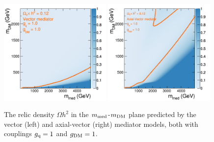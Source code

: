\appendix

\begin{center}
\begin{figure}[h]
\includegraphics[width=0.49\textwidth]{figures/scan_V_g1_MD_xxd_V_gq1.png} 
\includegraphics[width=0.49\textwidth]{figures/scan_A_g1_MD_xxd_A_gq1.png} \\
\caption{The relic density $\Omega h^{2}$ in the $m_{\rm med}$-$m_{\rm DM}$ plane predicted by the vector (left) and axial-vector (right) mediator models, both with couplings $g_{\rm q}=1$ and $g_{\rm DM}=1$.}
\label{fig:DMBoundsg1}
\end{figure}
\end{center}

